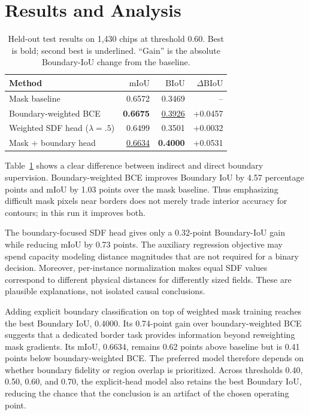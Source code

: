 \documentclass[10pt,twocolumn,letterpaper]{article}
\newcommand{\biou}{\mathrm{BIoU}}
\newcommand{\miou}{\mathrm{mIoU}}
\begin{document}
\section{Results and Analysis}
\begin{table}[t]
\centering
\caption{Held-out test results on 1,430 chips at threshold 0.60. Best is bold; second best is underlined. ``Gain'' is the absolute Boundary-IoU change from the baseline.}
\label{tab:results}
\small
\setlength{\tabcolsep}{3.2pt}
\begin{tabular}{@{}lrrr@{}}
\toprule
Method & $\miou$ & $\biou$ & $\Delta\biou$ \\
\midrule
Mask baseline & 0.6572 & 0.3469 & -- \\
Boundary-weighted BCE & \textbf{0.6675} & \underline{0.3926} & +0.0457 \\
Weighted SDF head ($\lambda=.5$) & 0.6499 & 0.3501 & +0.0032 \\
Mask + boundary head & \underline{0.6634} & \textbf{0.4000} & +0.0531 \\
\bottomrule
\end{tabular}
\end{table}

Table~\ref{tab:results} shows a clear difference between indirect and direct boundary supervision. Boundary-weighted BCE improves Boundary IoU by 4.57 percentage points and mIoU by 1.03 points over the mask baseline. Thus emphasizing difficult mask pixels near borders does not merely trade interior accuracy for contours; in this run it improves both.

The boundary-focused SDF head gives only a 0.32-point Boundary-IoU gain while reducing mIoU by 0.73 points. The auxiliary regression objective may spend capacity modeling distance magnitudes that are not required for a binary decision. Moreover, per-instance normalization makes equal SDF values correspond to different physical distances for differently sized fields. These are plausible explanations, not isolated causal conclusions.

Adding explicit boundary classification on top of weighted mask training reaches the best Boundary IoU, 0.4000. Its 0.74-point gain over boundary-weighted BCE suggests that a dedicated border task provides information beyond reweighting mask gradients. Its mIoU, 0.6634, remains 0.62 points above baseline but is 0.41 points below boundary-weighted BCE. The preferred model therefore depends on whether boundary fidelity or region overlap is prioritized. Across thresholds 0.40, 0.50, 0.60, and 0.70, the explicit-head model also retains the best Boundary IoU, reducing the chance that the conclusion is an artifact of the chosen operating point.
\end{document}
